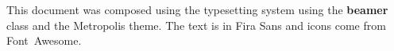 \begin{frame}[plain]
  \begin{adjustwidth}{20mm}{20mm}
    \scriptsize \raggedright %
    This document was composed using the {\XeLaTeX} typesetting system
    using the \textbf{beamer} class and the Metropolis theme. The text
    is in Fira Sans and icons come from Font~Awesome.
  \end{adjustwidth}
\end{frame}

